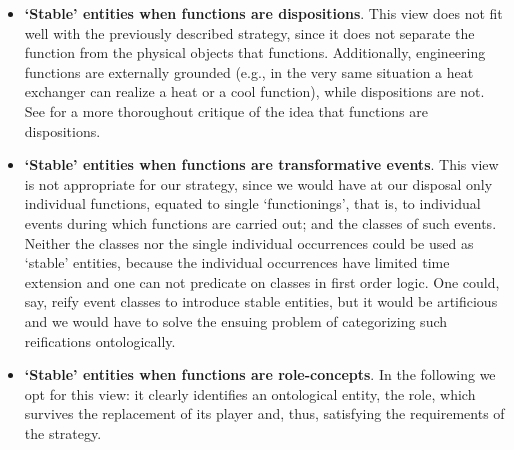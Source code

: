 \documentclass[
]{ceurart}
\begin{document}
\begin{itemize}
  \item \textbf{`Stable' entities when functions are dispositions}. This view does not fit well with the previously described strategy, since it does not separate the function from the physical objects that functions. Additionally, engineering functions are externally grounded (e.g., in the very same situation a heat exchanger can realize a heat or a cool function), while dispositions are not. See \cite{rohlWhyFunctionsAre2014} for a more thoroughout critique of the idea that functions are dispositions. %
  \item \textbf{`Stable' entities when functions are transformative events}.%
   This view is not appropriate  %
   for our strategy, since we would have at our disposal only individual functions, equated to single `functionings', that is, to individual events during which functions are carried out; and the classes of such events. Neither the classes nor the single individual occurrences could be used as `stable' entities, because the individual occurrences have limited time extension and one can not predicate on classes in first order logic.
   One could, say, reify event classes  to introduce stable entities, but it would be artificious and we would have to solve the ensuing problem of categorizing such reifications ontologically. %
  \item \textbf{`Stable' entities when functions are role-concepts}. In the following we opt for this view: it clearly identifies an ontological entity, the role, which survives the replacement of its player and, thus, satisfying the requirements of the strategy. 
\end{itemize}
\end{document}
